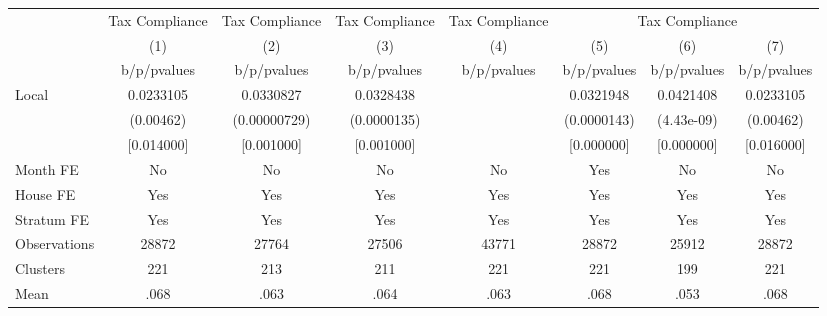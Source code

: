 {
\def\sym#1{\ifmmode^{#1}\else\(^{#1}\)\fi}
\begin{tabular}{l*{7}{c}}
\toprule
                &\multicolumn{1}{c}{Tax Compliance}&\multicolumn{1}{c}{Tax Compliance}&\multicolumn{1}{c}{Tax Compliance}&\multicolumn{1}{c}{Tax Compliance}&\multicolumn{3}{c}{Tax Compliance}\\
                &\multicolumn{1}{c}{(1)}&\multicolumn{1}{c}{(2)}&\multicolumn{1}{c}{(3)}&\multicolumn{1}{c}{(4)}&\multicolumn{1}{c}{(5)}&\multicolumn{1}{c}{(6)}&\multicolumn{1}{c}{(7)}\\
                &b/p/pvalues&b/p/pvalues&b/p/pvalues&b/p/pvalues&b/p/pvalues&b/p/pvalues&b/p/pvalues\\
\midrule
Local           &0.0233105&0.0330827&0.0328438&         &0.0321948&0.0421408&0.0233105\\
                &(0.00462)&(0.00000729)&(0.0000135)&         &(0.0000143)&(4.43e-09)&(0.00462)\\
                &[0.014000]&[0.001000]&[0.001000]&         &[0.000000]&[0.000000]&[0.016000]\\
Month FE        &       No&       No&       No&       No&      Yes&       No&       No\\
House FE        &      Yes&      Yes&      Yes&      Yes&      Yes&      Yes&      Yes\\
Stratum FE      &      Yes&      Yes&      Yes&      Yes&      Yes&      Yes&      Yes\\
\midrule
Observations    &    28872&    27764&    27506&    43771&    28872&    25912&    28872\\
Clusters        &      221&      213&      211&      221&      221&      199&      221\\
Mean            &     .068&     .063&     .064&     .063&     .068&     .053&     .068\\
\bottomrule
\end{tabular}
}
